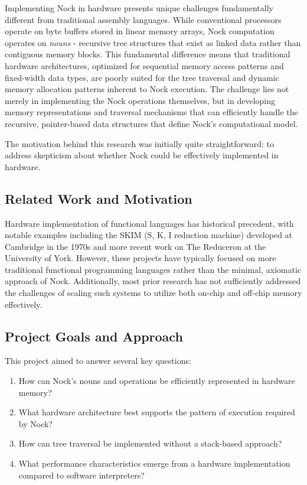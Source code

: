 \documentclass[twoside]{article}
\begin{document}
Implementing Nock in hardware presents unique challenges fundamentally different from traditional assembly languages. While conventional processors operate on byte buffers stored in linear memory arrays, Nock computation operates on \textit{nouns} - recursive tree structures that exist as linked data rather than contiguous memory blocks. This fundamental difference means that traditional hardware architectures, optimized for sequential memory access patterns and fixed-width data types, are poorly suited for the tree traversal and dynamic memory allocation patterns inherent to Nock execution. The challenge lies not merely in implementing the Nock operations themselves, but in developing memory representations and traversal mechanisms that can efficiently handle the recursive, pointer-based data structures that define Nock's computational model.

The motivation behind this research was initially quite straightforward: to address skepticism about whether Nock could be effectively implemented in hardware.

\subsection{Related Work and Motivation}

Hardware implementation of functional languages has historical precedent, with notable examples including the SKIM (S, K, I reduction machine) developed at Cambridge in the 1970s and more recent work on The Reduceron at the University of York. However, these projects have typically focused on more traditional functional programming languages rather than the minimal, axiomatic approach of Nock. Additionally, most prior research has not sufficiently addressed the challenges of scaling such systems to utilize both on-chip and off-chip memory effectively.

\subsection{Project Goals and Approach}

This project aimed to answer several key questions:

\begin{enumerate}
  \item How can Nock's nouns and operations be efficiently represented in hardware memory?
  \item What hardware architecture best supports the pattern of execution required by Nock?
  \item How can tree traversal be implemented without a stack-based approach?
  \item What performance characteristics emerge from a hardware implementation compared to software interpreters?
\end{enumerate}
\end{document}
